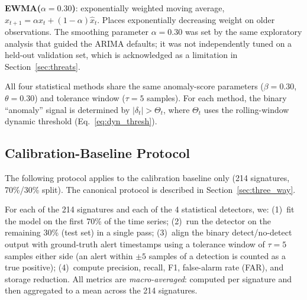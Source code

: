 \documentclass[a4paper,fleqn]{cas-sc}
\theoremstyle{plain}
\begin{document}
\textbf{EWMA($\alpha=0.30$)}: exponentially weighted moving average,
$\hat{x}_{t+1} = \alpha x_t + (1-\alpha)\hat{x}_t$.
Places exponentially decreasing weight on older observations.
The smoothing parameter $\alpha=0.30$ was set by the same exploratory
analysis that guided the ARIMA defaults; it was not independently tuned
on a held-out validation set, which is acknowledged as a limitation
in Section~\ref{sec:threats}.

All four statistical methods share the same anomaly-score parameters
($\beta = 0.30$, $\theta = 0.30$) and tolerance window ($\tau = 5$ samples).
For each method, the binary ``anomaly'' signal is determined by
$|\delta_t| > \Theta_t$, where $\Theta_t$ uses the rolling-window dynamic
threshold (Eq.~\ref{eq:dyn_thresh}).

\subsection{Calibration-Baseline Protocol}\label{sec:largescale:protocol}

The following protocol applies to the calibration baseline only (214
signatures, 70\%/30\% split).  The canonical protocol is described in
Section~\ref{sec:three_way}.

For each of the 214 signatures and each of the 4 statistical detectors, we:
(1)~fit the model on the first 70\% of the time series;
(2)~run the detector on the remaining 30\% (test set) in a single pass;
(3)~align the binary detect/no-detect output with ground-truth alert
timestamps using a tolerance window of $\tau = 5$ samples either side
(an alert within $\pm5$ samples of a detection is counted as a true positive);
(4)~compute precision, recall, F1, false-alarm rate (FAR), and storage reduction.
All metrics are \emph{macro-averaged}: computed per signature and then
aggregated to a mean across the 214 signatures.
\end{document}
